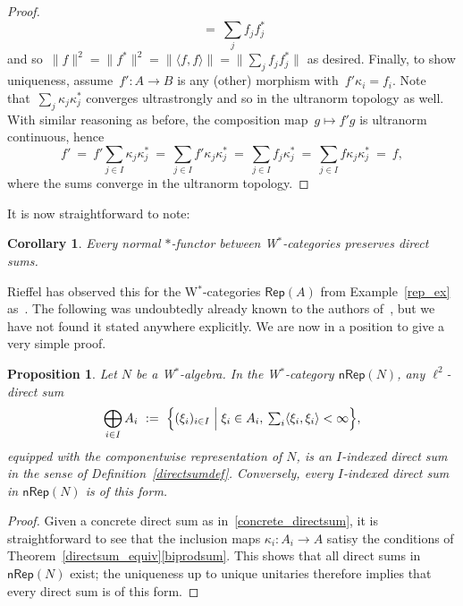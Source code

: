 \documentclass[reqno,T1,11pt]{amsproc}
\newcommand{\beq}{\begin{equation}}
\newcommand{\eeq}{\end{equation}}
\newcommand{\Rep}[1]{\mathsf{Rep}(#1)}		%
\newcommand{\NRep}[1]{\mathsf{nRep}(#1)}	%
\theoremstyle{plain}
\newtheorem{prop}[thm]{Proposition}
\newtheorem{cor}[thm]{Corollary}
\theoremstyle{remark}
\numberwithin{equation}{section}
\begin{document}
\begin{proof}
\begin{equation*}
        \ = \ \sum_j f_j f_j^*
 \end{equation*}
and so~$\| f \|^2 = \|f^*\|^2 = \|\langle f,f \rangle \|
                = \|\sum_j f_j f_j^* \|$ as desired.
Finally, to show uniqueness,
    assume~$f'\colon A \to B$ is any (other)
    morphism with~$f' \kappa_i = f_i$.
    Note that~$\sum_j \kappa_j \kappa_j^*$
       converges ultrastrongly
       and so in the ultranorm topology as well.
With similar reasoning as before,
        the composition map~$g \mapsto f' g$ is ultranorm continuous,
        hence
\begin{equation*}
    f'
    \ =\ f' \sum_{j \in I} \kappa_j \kappa_j^*
    \ =\ \sum_{j \in I} f' \kappa_j \kappa_j^*
    \ =\ \sum_{j \in I} f_j \kappa_j^*
    \ =\ \sum_{j \in I} f \kappa_j \kappa_j^*
    \ =\ f,
\end{equation*}
    where the sums converge in the ultranorm topology.
\end{proof}

It is now straightforward to note:

\begin{cor}
Every normal $*$-functor between W$^*$-categories preserves direct sums.
\end{cor}

Rieffel has observed this for the W$^*$-categories $\Rep{A}$ from Example~\ref{rep_ex} as~\cite[Proposition~4.9]{Rieffel1974}. The following was undoubtedly already known to the authors of~\cite{wstarcat}, but we have not found it stated anywhere explicitly. We are now in a position to give a very simple proof.

\begin{prop}
Let $N$ be a W$^*$-algebra. In the W$^*$-category $\NRep{N}$, any $\ell^2$-direct sum
\beq
\label{concrete_directsum}
	\bigoplus_{i\in I} A_i\  :=\  \Bigl\{ \textstyle (\xi_i)_{i\in I} \Bigm \vert \xi_i\in A_i,\: \sum_i \langle\xi_i,\xi_i\rangle < \infty \Bigr\},
\eeq
equipped with the componentwise representation of $N$, is an \emph{$I$-indexed direct sum} in the sense of Definition~\ref{directsumdef}. Conversely, every $I$-indexed direct sum in $\NRep{N}$ is of this form.
\end{prop}

\begin{proof}
	Given a concrete direct sum as in~\eqref{concrete_directsum}, it is straightforward to see that the inclusion maps $\kappa_i : A_i \to A$ satisy the conditions of Theorem~\ref{directsum_equiv}\ref{biprodsum}. This shows that all direct sums in $\NRep{N}$ exist; the uniqueness up to unique unitaries therefore implies that every direct sum is of this form.
\end{proof}





\end{document}
